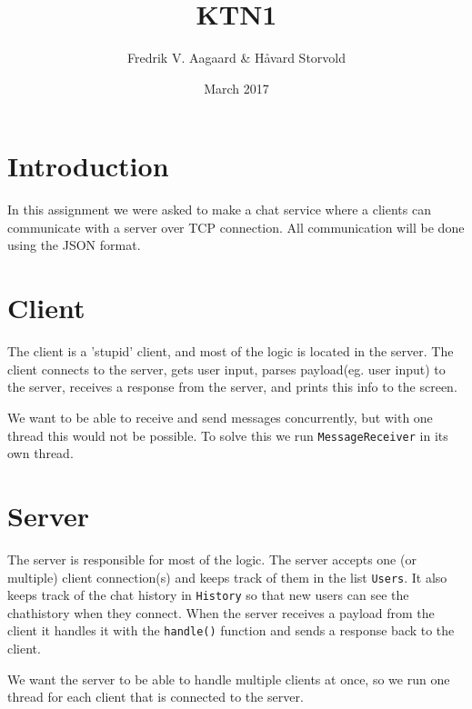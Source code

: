 \documentclass{article}
\title{KTN1}
\author{Fredrik V. Aagaard \& Håvard Storvold}
\date{March 2017}
\begin{document}
\maketitle
\section*{Introduction}
In this assignment we were asked to make a chat service where a clients can communicate with a server over TCP connection. All communication will be done using the JSON format.

\section*{Client}
The client is a 'stupid' client, and most of the logic is located in the server. The client connects to the server, gets user input, parses payload(eg. user input) to the server, receives a response from the server, and prints this info to the screen. 

We want to be able to receive and send messages concurrently, but with one thread this would not be possible. To solve this we run \texttt{MessageReceiver} in its own thread.

\section*{Server}
The server is responsible for most of the logic. The server accepts one (or multiple) client connection(s) and keeps track of them in the list \texttt{Users}. It also keeps track of the chat history in \texttt{History} so that new users can see the chathistory when they connect. When the server receives a payload from the client it handles it with the \texttt{handle()} function and sends a response back to the client. 

We want the server to be able to handle multiple clients at once, so we run one thread for each client that is connected to the server.
\end{document}
